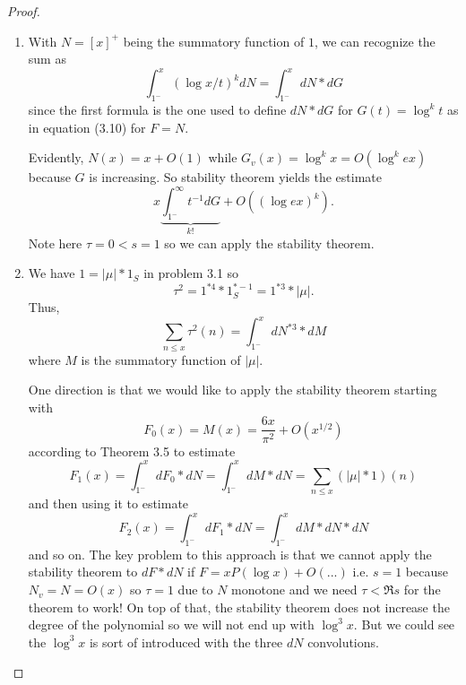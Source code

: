 \documentclass[12pt]{article}
\begin{document}
\begin{proof}
\begin{enumerate}
\item With $N = [x]^+$ being the summatory function of $1$, we can recognize the sum as
$$\int_{1^-}^x (\log x / t)^k dN = \int_{1^-}^x dN * dG$$
since the first formula is the one used to define $dN * dG$ for $G(t) = \log^k t$ as in equation (3.10) for $F = N$.

Evidently, $N(x) = x + O(1)$ while $G_v(x) = \log^k x = O(\log^k ex)$ because $G$ is increasing. So stability theorem yields the estimate
$$x \underbrace{\int_{1^-}^\infty t^{-1} dG}_{k!} + O((\log ex)^k).$$
Note here $\tau = 0 < s = 1$ so we can apply the stability theorem.

\item We have $1 = |\mu| * 1_S$ in problem 3.1 so
$$\tau^2 = 1^{*4} * 1_S^{*-1} = 1^{*3} * |\mu|.$$
Thus,
$$\sum_{n \leq x} \tau^2(n) = \int_{1^-}^x dN^{*3} * dM$$
where $M$ is the summatory function of $|\mu|$.

One direction is that we would like to apply the stability theorem starting with
$$F_0(x) = M(x) = \frac{6x}{\pi^2} + O(x^{1/2})$$
according to Theorem 3.5 to estimate
$$F_1(x) = \int_{1^-}^x dF_0 * dN = \int_{1^-}^x dM * dN = \sum_{n \leq x} (|\mu| * 1)(n)$$
and then using it to estimate
$$F_2(x) = \int_{1^-}^x dF_1 * dN = \int_{1^-}^x dM * dN * dN$$
and so on. The key problem to this approach is that we cannot apply the stability theorem to $dF * dN$ if $F = x P(\log x) + O(...)$ i.e. $s = 1$ because $N_v = N = O(x)$ so $\tau = 1$ due to $N$ monotone and we need $\tau < \Re s$ for the theorem to work! On top of that, the stability theorem does not increase the degree of the polynomial so we will not end up with $\log^3 x$. But we could see the $\log^3 x$ is sort of introduced with the three $dN$ convolutions.


\end{enumerate}
\end{proof}
\end{document}
